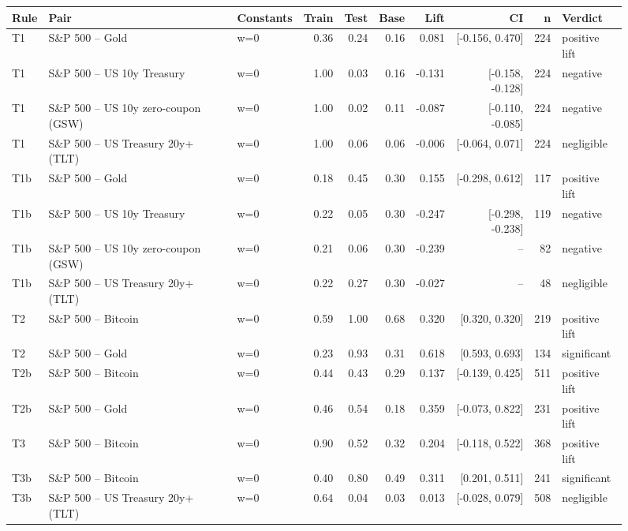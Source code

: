 \begin{figure}
\centering
\begin{tabular}{lllrrrrrrl}
\toprule
Rule & Pair & Constants & Train & Test & Base & Lift & CI & n & Verdict \\
\midrule
T1 & S\&P 500 -- Gold & w=0 & 0.36 & 0.24 & 0.16 & 0.081 & [-0.156, 0.470] & 224 & positive lift \\
T1 & S\&P 500 -- US 10y Treasury & w=0 & 1.00 & 0.03 & 0.16 & -0.131 & [-0.158, -0.128] & 224 & negative \\
T1 & S\&P 500 -- US 10y zero-coupon (GSW) & w=0 & 1.00 & 0.02 & 0.11 & -0.087 & [-0.110, -0.085] & 224 & negative \\
T1 & S\&P 500 -- US Treasury 20y+ (TLT) & w=0 & 1.00 & 0.06 & 0.06 & -0.006 & [-0.064, 0.071] & 224 & negligible \\
T1b & S\&P 500 -- Gold & w=0 & 0.18 & 0.45 & 0.30 & 0.155 & [-0.298, 0.612] & 117 & positive lift \\
T1b & S\&P 500 -- US 10y Treasury & w=0 & 0.22 & 0.05 & 0.30 & -0.247 & [-0.298, -0.238] & 119 & negative \\
T1b & S\&P 500 -- US 10y zero-coupon (GSW) & w=0 & 0.21 & 0.06 & 0.30 & -0.239 & -- & 82 & negative \\
T1b & S\&P 500 -- US Treasury 20y+ (TLT) & w=0 & 0.22 & 0.27 & 0.30 & -0.027 & -- & 48 & negligible \\
T2 & S\&P 500 -- Bitcoin & w=0 & 0.59 & 1.00 & 0.68 & 0.320 & [0.320, 0.320] & 219 & positive lift \\
T2 & S\&P 500 -- Gold & w=0 & 0.23 & 0.93 & 0.31 & 0.618 & [0.593, 0.693] & 134 & significant \\
T2b & S\&P 500 -- Bitcoin & w=0 & 0.44 & 0.43 & 0.29 & 0.137 & [-0.139, 0.425] & 511 & positive lift \\
T2b & S\&P 500 -- Gold & w=0 & 0.46 & 0.54 & 0.18 & 0.359 & [-0.073, 0.822] & 231 & positive lift \\
T3 & S\&P 500 -- Bitcoin & w=0 & 0.90 & 0.52 & 0.32 & 0.204 & [-0.118, 0.522] & 368 & positive lift \\
T3b & S\&P 500 -- Bitcoin & w=0 & 0.40 & 0.80 & 0.49 & 0.311 & [0.201, 0.511] & 241 & significant \\
T3b & S\&P 500 -- US Treasury 20y+ (TLT) & w=0 & 0.64 & 0.04 & 0.03 & 0.013 & [-0.028, 0.079] & 508 & negligible \\

\end{tabular}
\end{figure}
